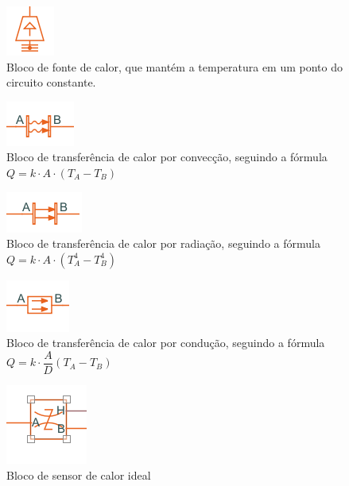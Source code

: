\begin{figure}[H]
    \centering
    \includegraphics[scale=1.0]{figuras/projeto/controle/fonte_calor.png}
    \caption{Bloco de fonte de calor, que mantém a temperatura em um ponto do circuito constante.}
    \label{fig:sim_fonte_calor}
\end{figure}

\begin{figure}[H]
    \centering
    \includegraphics[scale=1.0]{figuras/projeto/controle/conveccao.png}
    \caption{Bloco de transferência de calor por convecção, seguindo a fórmula \(Q = k \cdot A \cdot (T_A - T_B) \)}
    \label{fig:sim_conveccao}
\end{figure}

\begin{figure}[H]
    \centering
    \includegraphics[scale=1.0]{figuras/projeto/controle/radiacao.png}
    \caption{Bloco de transferência de calor por radiação, seguindo a fórmula \(Q = k \cdot A \cdot (T_A^4 - T_B^4) \)}
    \label{fig:sim_radiacao}
\end{figure}

\begin{figure}[H]
    \centering
    \includegraphics[scale=1.0]{figuras/projeto/controle/conducao.png}
    \caption{Bloco de transferência de calor por condução, seguindo a fórmula \(Q = k \cdot \dfrac{A}{D} (T_A - T_B) \)}
    \label{fig:sim_conducao}
\end{figure}

\begin{figure}[H]
    \centering
    \includegraphics[scale=0.8]{figuras/projeto/controle/sensor_ideal.png}
    \caption{Bloco de sensor de calor ideal}
    \label{fig:sim_sensor}
\end{figure}

